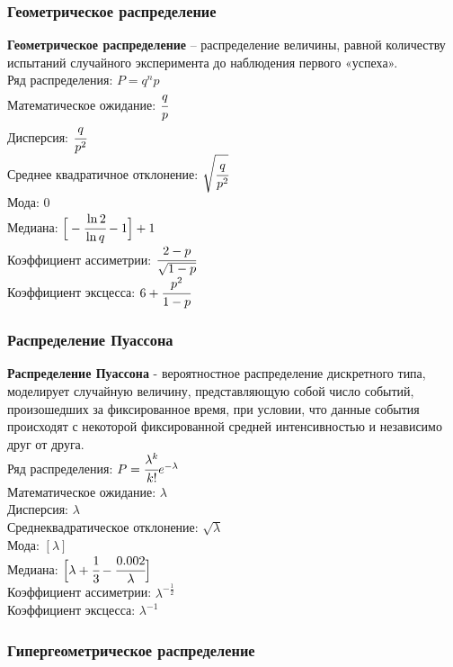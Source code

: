 \subsubsection{Геометрическое распределение}

\textbf{Геометрическое распределение} – распределение величины, равной количеству испытаний случайного эксперимента до наблюдения первого «успеха». \\
Ряд распределения: $P = q^n p$\\
Математическое ожидание: $\cfrac{q}{p}$\\
Дисперсия: $\cfrac{q}{p^2}$\\
Среднее квадратичное отклонение: $\sqrt{\cfrac{q}{p^2}}$\\
Мода: $0$ \\
Медиана: $\Big[-\cfrac{\ln2}{\ln q}-1\Big]+1$\\
Коэффициент ассиметрии: $\cfrac{2-p}{\sqrt{1-p}}$\\
Коэффициент эксцесса: $6+ \cfrac{p^2}{1-p}$\\


\subsubsection{Распределение Пуассона}

\textbf{Распределение Пуассона} - вероятностное распределение дискретного типа, моделирует случайную величину, представляющую собой число событий, произошедших за фиксированное время, при условии, 
что данные события происходят с некоторой фиксированной средней интенсивностью и независимо друг от друга. \\
Ряд распределения: $P= \cfrac{\lambda^k}{k!} e^{-\lambda}$\\
Математическое ожидание: $\lambda$\\
Дисперсия: $\lambda$\\
Среднеквадратическое отклонение: $\sqrt{\lambda}$\\
Мода: $[\lambda]$\\
Медиана: $\Big[ \lambda + \cfrac{1}{3} - \cfrac{0.002}{\lambda} \Big]$\\
Коэффициент ассиметрии: $\lambda^{-\frac{1}{2}}$\\
Коэффициент эксцесса: $\lambda^{-1}$\\

\subsubsection{Гипергеометрическое распределение}

